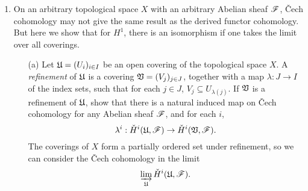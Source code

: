 \documentclass[a4paper]{article}
\begin{document}
\begin{enumerate} [label=\textbf{\arabic*.}, leftmargin=0em]
\begin{proof}
  Let $\goth{U}$ be the open covering by the two open sets $V = X - \{ x = 0 \}$ and $U = X - \{ y = 0 \}$, with affine coordinates obtained by restricting the ones from $X$.
  Then the Čech complex has only two terms:
  \begin{align*}
    C^0 & = \Gamma(V, \fO_V) \times \Gamma(W, \fO_W), \\
    C^1 & = \Gamma(V \cap W, \fO_{V \cap W}).
  \end{align*}
  Now
  \begin{align*}
    \Gamma(V, \Omega) & = k\bigg[ x, \frac{1}{x}, y \bigg] \\
    \Gamma(W, \Omega) & = k\bigg[ x, y, \frac{1}{y}\bigg] \\
    \Gamma(V, W, \Omega) & = k\bigg[ x, y, \frac{1}{x}, \frac{1}{y} \bigg] 
  \end{align*}
  and the map $d : C^0 \to C^1$ is given by $(f, g) \mapsto f - g$. To compute $H^1$, the image of $d$ is the set of all expressions $x^i y^j$ where at least one of $i, j$ is non-negative. Hence, $H^1(U, \fO_U)$ is spanned by $\{ x^iy^j \mid i, j < 0 \}$.
\end{proof}

\item On an arbitrary topological space $X$ with an arbitrary Abelian sheaf $\mathscr{F}$, Čech cohomology may not give the same result as the derived functor cohomology.
But here we show that for $H^1$, there is an isomorphism if one takes the limit over all coverings.
\begin{itemize}
  \item[(a)] Let $\mathfrak{U} = (U_i)_{i \in I}$ be an open covering of the topological space $X$.
  A \textit{refinement} of $\goth{U}$ is a covering $\mathfrak{V} = (V_j)_{j \in J}$, together with a map $\lambda : J \to I$ of the index sets, such that for each $j \in J$, $V_j \subseteq U_{\lambda(j)}$.
  If $\mathfrak{V}$ is a refinement of $\goth{U}$, show that there is a natural induced map on Čech cohomology for any Abelian sheaf $\mathscr{F}$, and for each $i$,
  \begin{equation*}
    \lambda^i : \check{H}^i(\mathfrak{U}, \mathscr{F}) \to \check{H}^i(\mathfrak{V}, \mathscr{F}).
  \end{equation*}
  The coverings of $X$ form a partially ordered set under refinement, so we can consider the Čech cohomology in the limit
  \begin{equation*}
    \varinjlim_{\mathfrak{U}} \check{H}^i(\mathfrak{U}, \mathscr{F}).
  \end{equation*}


\end{itemize}
\end{enumerate}
\end{document}
